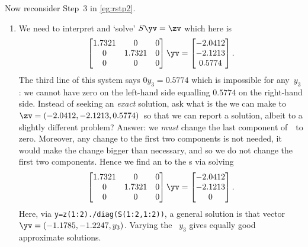 \begin{example}
Now reconsider Step~3 in \cref{eg:rstp2}.
\begin{enumerate} \addtocounter{enumi}2
\item We need to interpret and `solve' \(S\yv=\zv\) which here is
\begin{equation*}
\begin{bmatrix} 1.7321&0&0
\\0&1.7321&0
\\0&0&0 \end{bmatrix}\yv=\begin{bmatrix} 
   -2.0412\\-2.1213\\0.5774
\end{bmatrix}.
\end{equation*}
The third line of this system says \(0y_3=0.5774\) which is impossible for any~\(y_3\): we cannot have zero on the left-hand side equalling \(0.5774\) on the right-hand side.
Instead of seeking an \emph{exact} solution, ask what is the \emph{} we can make to~\(\zv=(-2.0412, -2.1213, 0.5774)\)\ so that we can report a solution, albeit to a slightly different problem?
Answer: we \emph{must} change the last component of~\zv\ to zero. 
Moreover, any change to the first two components is not needed, it would make the change bigger than necessary, and so we do not change the first two components.
Hence we find an  to the s via solving
\begin{equation*}
\begin{bmatrix} 1.7321&0&0
\\0&1.7321&0
\\0&0&0 \end{bmatrix}\yv=\begin{bmatrix} 
   -2.0412\\-2.1213\\0
\end{bmatrix}.
\end{equation*}
Here, via \verb|y=z(1:2)./diag(S(1:2,1:2))|, a general solution is that vector \(\yv=(-1.1785,-1.2247,y_3)\).
Varying the ~\(y_3\) gives equally good approximate solutions.


\end{enumerate}
\end{example}
